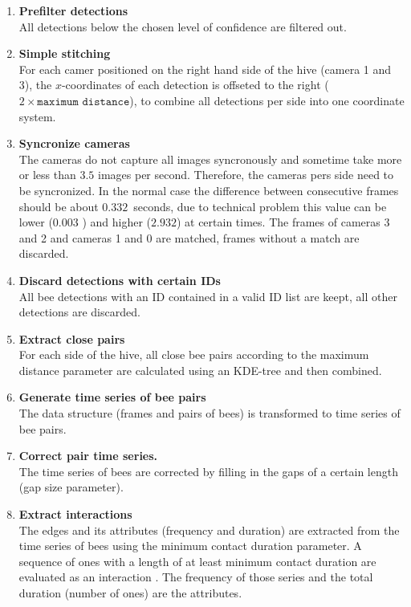 \begin{enumerate}
\item \textbf{Prefilter detections}\\
All detections below the chosen level of confidence are filtered out.

\item \textbf{Simple stitching}\\
For each camer positioned on the right hand side of the hive (camera 1 and 3), the $x$-coordinates of each detection is offseted to the right ($2\times \texttt{maximum distance}$), to combine all detections per side into one coordinate system.

\item \textbf{Syncronize cameras}\\
The cameras do not capture all images syncronously and sometime take more or less than $3.5$ images per second.
Therefore, the cameras pers side need to be syncronized. In the normal case the difference between consecutive frames should be about $0.332$~seconds, due to technical problem this value can be lower ($0.003$ ) and higher ($2.932$) at certain times. The frames of cameras 3 and 2 and cameras 1 and 0 are matched, frames without a match are discarded.

\item \textbf{Discard detections with certain IDs}\\
All bee detections with an ID contained in a valid ID list are keept, all other detections are discarded.

\item \textbf{Extract close pairs}\\
For each side of the hive, all close bee pairs according to the maximum distance parameter are calculated using an KDE-tree and then combined.

\item \textbf{Generate time series of bee pairs}\\
The data structure (frames and pairs of bees) is transformed to time series of bee pairs.

\item \textbf{Correct pair time series.}\\
The time series of bees are corrected by filling in the gaps of a certain length (gap size parameter).

\item \textbf{Extract interactions}\\
The edges and its attributes (frequency and duration) are extracted from the time series of bees using the minimum contact duration parameter. A sequence of ones with a length of at least minimum contact duration are evaluated as an interaction . The frequency of those series and the total duration (number of ones) are the attributes.
\end{enumerate}


